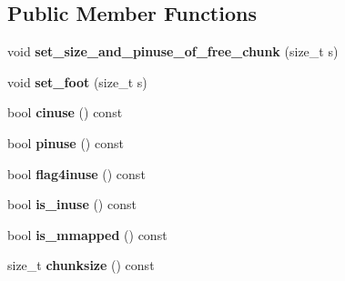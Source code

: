 \subsection*{Public Member Functions}
\begin{DoxyCompactItemize}
\item 
void {\bfseries set\+\_\+size\+\_\+and\+\_\+pinuse\+\_\+of\+\_\+free\+\_\+chunk} (size\+\_\+t s)\hypertarget{structspp_1_1malloc__chunk__header_a876115d5cd3269ea47ee030601bc5f5a}{}\label{structspp_1_1malloc__chunk__header_a876115d5cd3269ea47ee030601bc5f5a}

\item 
void {\bfseries set\+\_\+foot} (size\+\_\+t s)\hypertarget{structspp_1_1malloc__chunk__header_ab7c2844231326aac1b46517329a552bd}{}\label{structspp_1_1malloc__chunk__header_ab7c2844231326aac1b46517329a552bd}

\item 
bool {\bfseries cinuse} () const \hypertarget{structspp_1_1malloc__chunk__header_a868b5a36d6c5add0e7de84f934fb6ad0}{}\label{structspp_1_1malloc__chunk__header_a868b5a36d6c5add0e7de84f934fb6ad0}

\item 
bool {\bfseries pinuse} () const \hypertarget{structspp_1_1malloc__chunk__header_abfaeb0af12804287cbe597871f64e980}{}\label{structspp_1_1malloc__chunk__header_abfaeb0af12804287cbe597871f64e980}

\item 
bool {\bfseries flag4inuse} () const \hypertarget{structspp_1_1malloc__chunk__header_ab91fe84cc04fbd77be6a643c7544e7a0}{}\label{structspp_1_1malloc__chunk__header_ab91fe84cc04fbd77be6a643c7544e7a0}

\item 
bool {\bfseries is\+\_\+inuse} () const \hypertarget{structspp_1_1malloc__chunk__header_aee07a17b2f214a64b8544b4b8dabb179}{}\label{structspp_1_1malloc__chunk__header_aee07a17b2f214a64b8544b4b8dabb179}

\item 
bool {\bfseries is\+\_\+mmapped} () const \hypertarget{structspp_1_1malloc__chunk__header_aad2eeb7c2f82317ed11082f878d4fdd8}{}\label{structspp_1_1malloc__chunk__header_aad2eeb7c2f82317ed11082f878d4fdd8}

\item 
size\+\_\+t {\bfseries chunksize} () const \hypertarget{structspp_1_1malloc__chunk__header_aa47d16b1b20bb4c824c205138409a5a6}{}\label{structspp_1_1malloc__chunk__header_aa47d16b1b20bb4c824c205138409a5a6}


\end{DoxyCompactItemize}
